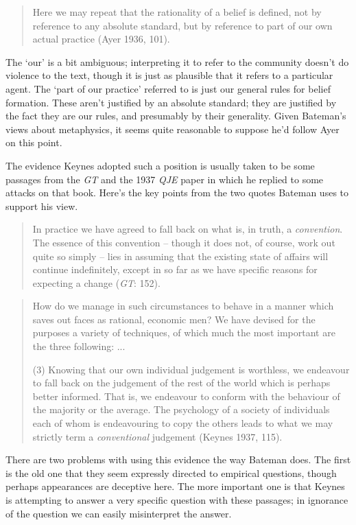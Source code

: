 \documentclass[noflushend]{philosophersimprint}
\begin{document}
\begin{quote}
Here we may repeat that the rationality of a belief is defined, not by
reference to any absolute standard, but by reference to part of our own
actual practice (Ayer 1936, 101).
\end{quote}

The `our' is a bit ambiguous; interpreting it to refer to the community
doesn't do violence to the text, though it is just as plausible that it
refers to a particular agent. The `part of our practice' referred to is
just our general rules for belief formation. These aren't justified by
an absolute standard; they are justified by the fact they are our rules,
and presumably by their generality. Given Bateman's views about
metaphysics, it seems quite reasonable to suppose he'd follow Ayer on
this point.

The evidence Keynes adopted such a position is usually taken to be some
passages from the \emph{GT} and the 1937 \emph{QJE} paper in which he
replied to some attacks on that book. Here's the key points from the two
quotes Bateman uses to support his view.

\begin{quote}
In practice we have agreed to fall back on what is, in truth, a
\emph{convention}. The essence of this convention -- though it does not,
of course, work out quite so simply -- lies in assuming that the
existing state of affairs will continue indefinitely, except in so far
as we have specific reasons for expecting a change (\emph{GT}: 152).
\end{quote}

\begin{quote}
How do we manage in such circumstances to behave in a manner which saves
out faces as rational, economic men? We have devised for the purposes a
variety of techniques, of which much the most important are the three
following: ...

(3) Knowing that our own individual judgement is worthless, we endeavour
to fall back on the judgement of the rest of the world which is perhaps
better informed. That is, we endeavour to conform with the behaviour of
the majority or the average. The psychology of a society of individuals
each of whom is endeavouring to copy the others leads to what we may
strictly term a \emph{conventional} judgement (Keynes 1937, 115).
\end{quote}

There are two problems with using this evidence the way Bateman does.
The first is the old one that they seem expressly directed to empirical
questions, though perhaps appearances are deceptive here. The more
important one is that Keynes is attempting to answer a very specific
question with these passages; in ignorance of the question we can easily
misinterpret the answer.
\end{document}
